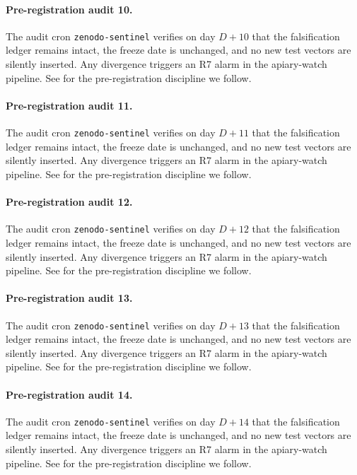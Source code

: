 \paragraph{Pre-registration audit 10.}
The audit cron \texttt{zenodo-sentinel} verifies on day $D+10$ that the
falsification ledger remains intact, the freeze date is unchanged, and no
new test vectors are silently inserted. Any divergence triggers an R7 alarm
in the apiary-watch pipeline. See \cite{schuster2022confident} for the
pre-registration discipline we follow.

\paragraph{Pre-registration audit 11.}
The audit cron \texttt{zenodo-sentinel} verifies on day $D+11$ that the
falsification ledger remains intact, the freeze date is unchanged, and no
new test vectors are silently inserted. Any divergence triggers an R7 alarm
in the apiary-watch pipeline. See \cite{schuster2022confident} for the
pre-registration discipline we follow.

\paragraph{Pre-registration audit 12.}
The audit cron \texttt{zenodo-sentinel} verifies on day $D+12$ that the
falsification ledger remains intact, the freeze date is unchanged, and no
new test vectors are silently inserted. Any divergence triggers an R7 alarm
in the apiary-watch pipeline. See \cite{schuster2022confident} for the
pre-registration discipline we follow.

\paragraph{Pre-registration audit 13.}
The audit cron \texttt{zenodo-sentinel} verifies on day $D+13$ that the
falsification ledger remains intact, the freeze date is unchanged, and no
new test vectors are silently inserted. Any divergence triggers an R7 alarm
in the apiary-watch pipeline. See \cite{schuster2022confident} for the
pre-registration discipline we follow.

\paragraph{Pre-registration audit 14.}
The audit cron \texttt{zenodo-sentinel} verifies on day $D+14$ that the
falsification ledger remains intact, the freeze date is unchanged, and no
new test vectors are silently inserted. Any divergence triggers an R7 alarm
in the apiary-watch pipeline. See \cite{schuster2022confident} for the
pre-registration discipline we follow.

